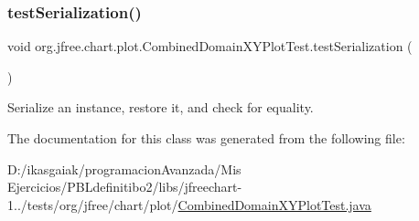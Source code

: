 \subsubsection{\texorpdfstring{test\+Serialization()}{testSerialization()}}
{\footnotesize\ttfamily void org.\+jfree.\+chart.\+plot.\+Combined\+Domain\+X\+Y\+Plot\+Test.\+test\+Serialization (\begin{DoxyParamCaption}{ }\end{DoxyParamCaption})}

Serialize an instance, restore it, and check for equality. 

The documentation for this class was generated from the following file\+:\begin{DoxyCompactItemize}
\item 
D\+:/ikasgaiak/programacion\+Avanzada/\+Mis Ejercicios/\+P\+B\+Ldefinitibo2/libs/jfreechart-\/1../tests/org/jfree/chart/plot/\mbox{\hyperlink{_combined_domain_x_y_plot_test_8java}{Combined\+Domain\+X\+Y\+Plot\+Test.\+java}}\end{DoxyCompactItemize}
